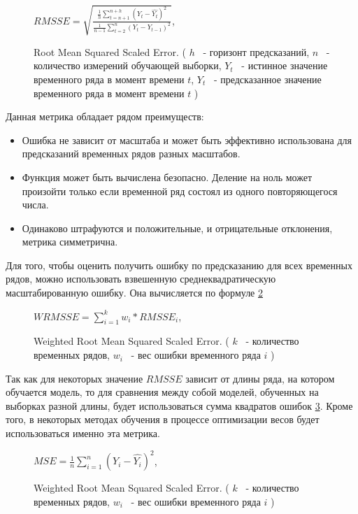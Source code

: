 \def\figurename{Формула}
\begin{figure}[t]
	\centering
	$ RMSSE = \sqrt{ \frac{ \frac{1}{h} \sum_{t=n+1}^{n+h}(Y_t - \hat{Y_t})^2  }{ \frac{1}{n-1} \sum_{t=2}^{n} (Y_t - Y_{t-1})^2 } } $,

	\caption{Root Mean Squared Scaled Error.
	(
		$ h $ ~- горизонт предсказаний,
		$ n $ ~- количество измерений обучающей выборки,
		$ Y_t $ ~- истинное значение временного ряда в момент времени $ t $,
		$ \hat{Y_t} $ ~- предсказанное значение временного ряда в момент времени $ t $
	)}
	\label{img:rmsse}
\end{figure}
\def\figurename{Рис.}

Данная метрика обладает рядом преимуществ:

\begin{itemize}
	\item Ошибка не зависит от масштаба и может быть эффективно использована для предсказаний временных рядов разных масштабов.
	\item Функция может быть вычислена безопасно. Деление на ноль может произойти только если временной ряд состоял из одного повторяющегося числа.
	\item Одинаково штрафуются и положительные, и отрицательные отклонения, метрика симметрична.
\end{itemize}

Для того, чтобы оценить получить ошибку по предсказанию для всех временных рядов,
можно использовать взвешенную среднеквадратическую масштабированную ошибку.
Она вычисляется по формуле \ref{img:wrmsse}

\def\figurename{Формула}
\begin{figure}[t]
	\centering
	$ WRMSSE = \sum_{i=1}^{k} w_i * RMSSE_i $,
	\caption{
		Weighted Root Mean Squared Scaled Error.
		(
			$ k $ ~- количество временных рядов,
			$ w_i $ ~- вес ошибки временного ряда $ i $
		)
	}
	\label{img:wrmsse}
\end{figure}
\def\figurename{Рис.}

Так как для некоторых значение $ RMSSE $ зависит от длины ряда, на котором обучается
модель, то для сравнения между собой моделей, обученных на выборках разной длины,
будет использоваться сумма квадратов ошибок \ref{img:mse}. Кроме того, в некоторых
методах обучения в процессе оптимизации весов будет использоваться именно эта метрика.

\def\figurename{Формула}
\begin{figure}[t]
	\centering
	$ MSE =  \frac{1}{n} \sum_{i=1}^{n} (Y_i  - \hat{Y_i})^2 $,
	\caption{
		Weighted Root Mean Squared Scaled Error.
		(
			$ k $ ~- количество временных рядов,
			$ w_i $ ~- вес ошибки временного ряда $ i $
		)
	}
	\label{img:mse}
\end{figure}
\def\figurename{Рис.}

